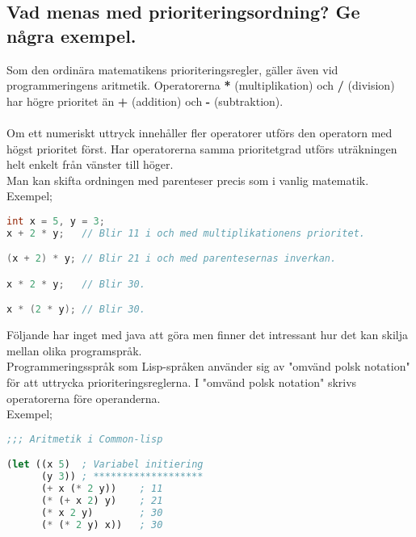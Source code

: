 \documentclass[../main.tex]{subfiles}
\begin{document}
\subsection{Vad menas med prioriteringsordning? Ge några exempel.}
Som den ordinära matematikens prioriteringsregler, gäller även vid programmeringens aritmetik. Operatorerna \textbf{*} (multiplikation) och \textbf{/} (division) har högre prioritet än \textbf{+} (addition) och \textbf{-} (subtraktion).\\
\\
Om ett numeriskt uttryck innehåller fler operatorer utförs den operatorn med högst prioritet först. Har operatorerna samma prioritetgrad utförs uträkningen helt enkelt från vänster till höger. \\
Man kan skifta ordningen med parenteser precis som i vanlig matematik.
\\
Exempel;
\begin{lstlisting}[language=java]
int x = 5, y = 3;
x + 2 * y;   // Blir 11 i och med multiplikationens prioritet.

(x + 2) * y; // Blir 21 i och med parentesernas inverkan.

x * 2 * y;   // Blir 30.

x * (2 * y); // Blir 30.
\end{lstlisting}
Följande har inget med java att göra men finner det intressant hur det kan skilja mellan olika programspråk.\\
Programmeringsspråk som Lisp-språken använder sig av "omvänd polsk notation" för att uttrycka prioriteringsreglerna.
I "omvänd polsk notation" skrivs operatorerna före operanderna.\\
Exempel;
\begin{lstlisting}[language=lisp]
;;; Aritmetik i Common-lisp

(let ((x 5)  ; Variabel initiering
      (y 3)) ; *******************
      (+ x (* 2 y))    ; 11
      (* (+ x 2) y)    ; 21
      (* x 2 y)        ; 30
      (* (* 2 y) x))   ; 30
\end{lstlisting}
\end{document}
